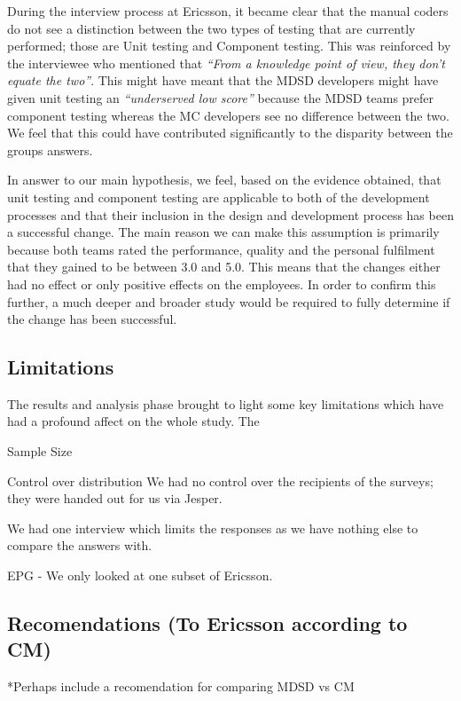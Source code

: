\documentclass[final_report_innit.tex]{subfiles}
\begin{document}
During the interview process at Ericsson, it became clear that the manual coders do not see a distinction between the two types of
testing that are currently performed; those are Unit testing and Component testing. This was reinforced by the interviewee who mentioned that \textit{``From a knowledge point of view, they don't equate the two''}. This might have meant that the MDSD developers might have given unit testing an \textit{``underserved low score''} because the MDSD teams prefer component testing whereas the MC developers see no difference between the two. We feel that this could have contributed significantly to the disparity between the groups answers.

In answer to our main hypothesis, we feel, based on the evidence obtained, that unit testing and component testing are applicable to both of the development processes and that their inclusion in the design and development process has been a successful change. The main reason we can make this assumption is primarily because both teams rated the performance, quality and the personal fulfilment that they gained to be between 3.0 and 5.0. This means that the changes either had no effect or only positive effects on the employees. In order to confirm this further, a much deeper and broader study would be required to fully determine if the change has been successful.

\subsection*{Limitations}

The results and analysis phase brought to light some key limitations which have had a profound affect on the whole study. The

Sample Size

Control over distribution
We had no control over the recipients of the surveys; they were handed out for us via Jesper.

We had one interview which limits the responses as we have nothing else to compare the answers with.

EPG - We only looked at one subset of Ericsson.

\subsection*{Recomendations (To Ericsson according to CM)}

*Perhaps include a recomendation for comparing MDSD vs CM
\end{document}
